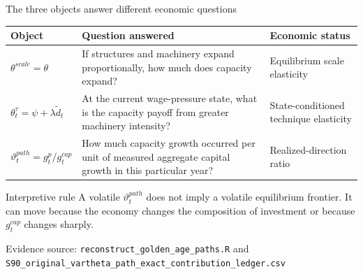 \documentclass[10pt,aspectratio=169]{beamer}
\newcommand{\sourcefooter}[1]{%
  \par\vfill{\tiny\color{gray!70}Evidence source: #1}\vspace{-0.35em}}
\begin{document}
\begin{frame}{The three objects answer different economic questions}
  \renewcommand{\arraystretch}{1.35}
  \begin{table}
    \centering
    \small
    \begin{tabular}{@{}p{}p{}p{}@{}}
      \toprule
      \textbf{Object} & \textbf{Question answered} & \textbf{Economic status} \\
      \midrule
      $\theta^{scale}=\theta$ & If structures and machinery expand proportionally, how much does capacity expand? & Equilibrium scale elasticity \\
      $\theta_t^{\tau}=\psi+\lambda\widetilde d_t$ & At the current wage-pressure state, what is the capacity payoff from greater machinery intensity? & State-conditioned technique elasticity \\
      $\vartheta_t^{path}=g_t^p/g_t^{cap}$ & How much capacity growth occurred per unit of measured aggregate capital growth in this particular year? & Realized-direction ratio \\
      \bottomrule
    \end{tabular}
  \end{table}
  \begin{alertblock}{Interpretive rule}
    A volatile $\vartheta_t^{path}$ does not imply a volatile equilibrium frontier. It can move because the economy changes the composition of investment or because $g_t^{cap}$ changes sharply.
  \end{alertblock}
  \sourcefooter{\texttt{reconstruct\_golden\_age\_paths.R} and \texttt{S90\_original\_vartheta\_path\_exact\_contribution\_ledger.csv}}
\end{frame}
\end{document}
